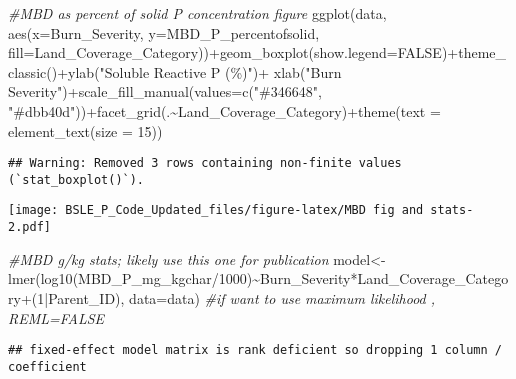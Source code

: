 \documentclass[
]{article}
\newenvironment{Shaded}{\begin{snugshade}}{\end{snugshade}}
\newcommand{\AttributeTok}[1]{\textcolor[rgb]{0.77,0.63,0.00}{#1}}
\newcommand{\CommentTok}[1]{\textcolor[rgb]{0.56,0.35,0.01}{\textit{#1}}}
\newcommand{\ConstantTok}[1]{\textcolor[rgb]{0.00,0.00,0.00}{#1}}
\newcommand{\DecValTok}[1]{\textcolor[rgb]{0.00,0.00,0.81}{#1}}
\newcommand{\FunctionTok}[1]{\textcolor[rgb]{0.00,0.00,0.00}{#1}}
\newcommand{\NormalTok}[1]{#1}
\newcommand{\OtherTok}[1]{\textcolor[rgb]{0.56,0.35,0.01}{#1}}
\newcommand{\SpecialCharTok}[1]{\textcolor[rgb]{0.00,0.00,0.00}{#1}}
\newcommand{\StringTok}[1]{\textcolor[rgb]{0.31,0.60,0.02}{#1}}
\begin{document}
\begin{Shaded}
\begin{Highlighting}[]
\CommentTok{\#MBD as percent of solid P concentration figure}
\FunctionTok{ggplot}\NormalTok{(data, }\FunctionTok{aes}\NormalTok{(}\AttributeTok{x=}\NormalTok{Burn\_Severity, }\AttributeTok{y=}\NormalTok{MBD\_P\_percentofsolid, }\AttributeTok{fill=}\NormalTok{Land\_Coverage\_Category))}\SpecialCharTok{+}\FunctionTok{geom\_boxplot}\NormalTok{(}\AttributeTok{show.legend=}\ConstantTok{FALSE}\NormalTok{)}\SpecialCharTok{+}\FunctionTok{theme\_classic}\NormalTok{()}\SpecialCharTok{+}\FunctionTok{ylab}\NormalTok{(}\StringTok{"Soluble Reactive P (\%)"}\NormalTok{)}\SpecialCharTok{+} \FunctionTok{xlab}\NormalTok{(}\StringTok{"Burn Severity"}\NormalTok{)}\SpecialCharTok{+}\FunctionTok{scale\_fill\_manual}\NormalTok{(}\AttributeTok{values=}\FunctionTok{c}\NormalTok{(}\StringTok{"\#346648"}\NormalTok{, }\StringTok{"\#dbb40d"}\NormalTok{))}\SpecialCharTok{+}\FunctionTok{facet\_grid}\NormalTok{(.}\SpecialCharTok{\textasciitilde{}}\NormalTok{Land\_Coverage\_Category)}\SpecialCharTok{+}\FunctionTok{theme}\NormalTok{(}\AttributeTok{text =} \FunctionTok{element\_text}\NormalTok{(}\AttributeTok{size =} \DecValTok{15}\NormalTok{))}
\end{Highlighting}
\end{Shaded}

\begin{verbatim}
## Warning: Removed 3 rows containing non-finite values (`stat_boxplot()`).
\end{verbatim}

\texttt{[image: BSLE\_P\_Code\_Updated\_files/figure-latex/MBD fig and stats-2.pdf]}

\begin{Shaded}
\begin{Highlighting}[]
\CommentTok{\#MBD g/kg stats; likely use this one for publication}
\NormalTok{model}\OtherTok{\textless{}{-}}\FunctionTok{lmer}\NormalTok{(}\FunctionTok{log10}\NormalTok{(MBD\_P\_mg\_kgchar}\SpecialCharTok{/}\DecValTok{1000}\NormalTok{)}\SpecialCharTok{\textasciitilde{}}\NormalTok{Burn\_Severity}\SpecialCharTok{*}\NormalTok{Land\_Coverage\_Category}\SpecialCharTok{+}\NormalTok{(}\DecValTok{1}\SpecialCharTok{|}\NormalTok{Parent\_ID), }\AttributeTok{data=}\NormalTok{data) }\CommentTok{\#if want to use maximum likelihood , REML=FALSE}
\end{Highlighting}
\end{Shaded}

\begin{verbatim}
## fixed-effect model matrix is rank deficient so dropping 1 column / coefficient
\end{verbatim}
\end{document}
